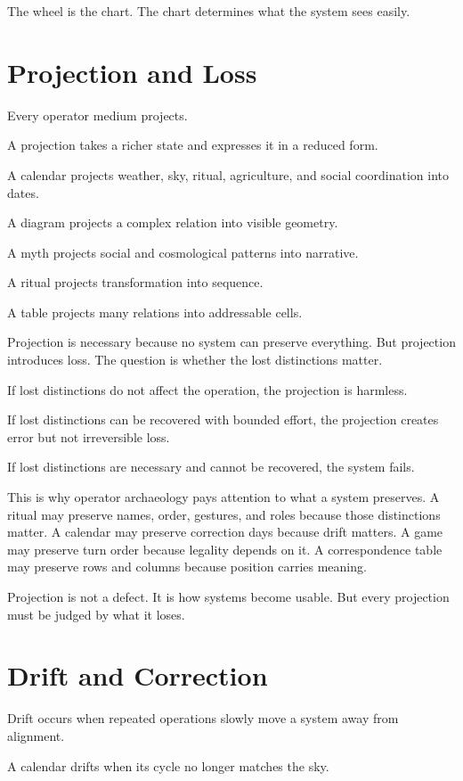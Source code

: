 \documentclass[11pt]{book}
\begin{document}
The wheel is the chart. The chart determines what the system sees easily.

\section{Projection and Loss}

Every operator medium projects.

A projection takes a richer state and expresses it in a reduced form.

A calendar projects weather, sky, ritual, agriculture, and social coordination into dates.

A diagram projects a complex relation into visible geometry.

A myth projects social and cosmological patterns into narrative.

A ritual projects transformation into sequence.

A table projects many relations into addressable cells.

Projection is necessary because no system can preserve everything. But projection introduces loss. The question is whether the lost distinctions matter.

If lost distinctions do not affect the operation, the projection is harmless.

If lost distinctions can be recovered with bounded effort, the projection creates error but not irreversible loss.

If lost distinctions are necessary and cannot be recovered, the system fails.

This is why operator archaeology pays attention to what a system preserves. A ritual may preserve names, order, gestures, and roles because those distinctions matter. A calendar may preserve correction days because drift matters. A game may preserve turn order because legality depends on it. A correspondence table may preserve rows and columns because position carries meaning.

Projection is not a defect. It is how systems become usable. But every projection must be judged by what it loses.

\section{Drift and Correction}

Drift occurs when repeated operations slowly move a system away from alignment.

A calendar drifts when its cycle no longer matches the sky.
\end{document}
